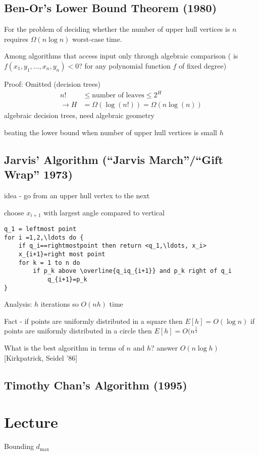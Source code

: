 \documentclass[english,12pt]{article}
\theoremstyle{plain}
\theoremstyle{definition}
\theoremstyle{definition} %
\begin{document}
\subsection{Ben-Or's Lower Bound Theorem (1980)}
For the problem of deciding whether the number of upper hull vertices is $n$ requires $\Omega(n\log n)$ worst-case time.

Among algorithms that access input only through algebraic comparison ( is $f(x_1, y_1,\ldots, x_n, y_n)<0$? for any polynomial function $f$ of fixed degree)

Proof: Omitted (decision trees)
\begin{align*}
n!&\le \text{number of leaves}\le 2^H\\
\rightarrow H&=\Omega(\log(n!))
=\Omega(n\log(n))
\end{align*}
algebraic decision trees, need algebraic geometry

beating the lower bound when number of upper hull vertices is small $h$

\subsection{Jarvis' Algorithm (``Jarvis March''/``Gift Wrap'' 1973)}
idea - go from an upper hull vertex to the next

choose $x_{i+1}$ with largest angle compared to vertical
\begin{verbatim}
q_1 = leftmost point
for i =1,2,\ldots do {
    if q_i==rightmostpoint then return <q_1,\ldots, x_i>
    x_{i+1}=right most point
    for k = 1 to n do
        if p_k above \overline{q_iq_{i+1}} and p_k right of q_i
            q_{i+1}=p_k
}
\end{verbatim}

Analysis:
$h$ iterations so $O(nh)$ time

Fact - if points are uniformly distributed in a square then $E\left[ h\right] = O(\log n)$
if points are uniformly distributed in a circle then $E\left[ h \right]=O(n^{\frac{1}{3}}$

What is the best algorithm in terms of $n$ and $h$?
answer $O(n\log h)$ [Kirkpatrick, Seidel '86]

\subsection{Timothy Chan's Algorithm (1995)}


\section{Lecture}
Bounding $d_{\text{max}}$
\end{document}
